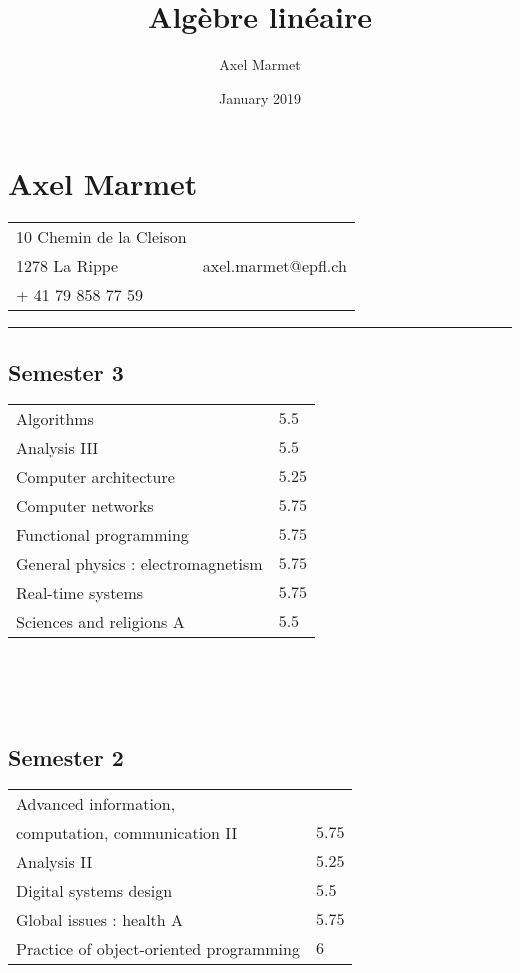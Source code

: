 \documentclass[11pt]{article}
\title{Algèbre linéaire}
\author{Axel Marmet }
\date{January 2019}
\begin{document}
\section*{\centering Axel Marmet}
\begin{tabular}{ >{\raggedright}m{} >{\raggedleft}m{} }
    10 Chemin de la Cleison \\ 1278 La Rippe & axel.marmet@epfl.ch \\ + 41 79 858 77 59\\
\end{tabular}
\begin{center}
    \rule{1\textwidth}{1pt}
\end{center}
\begin{minipage}[t]{0.33\textwidth}
    \subsection*{Semester 3}
    \begin{tabular}{ >{\raggedright}m{4cm} m{2cm} }
        Algorithms & $5.5$  \\ 
        Analysis III& $5.5$  \\  
        Computer architecture & $5.25$  \\  
        Computer networks & $5.75$  \\
        Functional programming & $5.75$ \\
        General physics : electromagnetism & $5.75$ \\
        Real-time systems & $5.75$  \\
        Sciences and religions A & $5.5$   
      \end{tabular}
      \\\\\\
      \subsection*{Semester 2}
      \begin{tabular}{ >{\raggedright}m{4cm} m{2cm} }
        Advanced information, \\computation, communication II & $5.75$  \\ 
        Analysis II & $5.25$  \\  
        Digital systems design & $5.5$  \\  
        Global issues : health A & $5.75$  \\
        Practice of object-oriented programming & $6$ \\
      \end{tabular}
      \\\\\\

\end{minipage}
\end{document}
